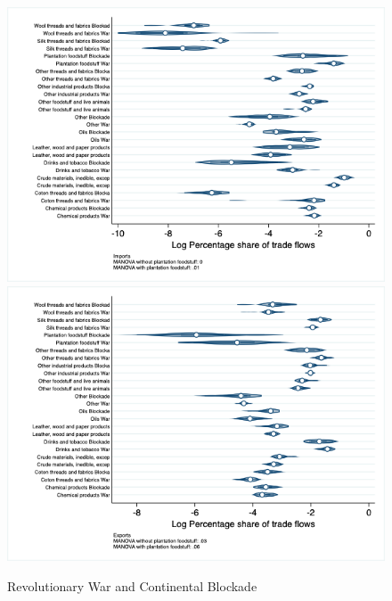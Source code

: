 \documentclass[12pt,a4paper,notitlepage,english]{article}
\begin{document}
\begin{figure}
\centering
\caption{Revolutionary War and Continental Blockade}
\label{rev_block_nat_distr_sitc}
\includegraphics[scale=.4]{rev_block_nat_distr_Isitc}
\includegraphics[scale=.4]{rev_block_nat_distr_Xsitc}
\end{figure}
\end{document}

